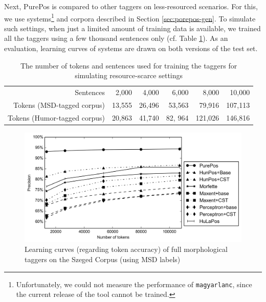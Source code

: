 Next, PurePos is compared to other taggers on less-resourced scenarios.
For this, we use systems\footnote{Unfortunately, we could not measure the performance of \texttt{magyarlanc}, since the current release of the tool cannot be trained.}  and corpora described in Section \ref{sec:porepos-gen}.
To simulate such settings, when just a limited amount of training data is available, we trained all the taggers using a few thousand sentences only (cf. Table \ref{tab:small-szeged}).
As an evaluation, learning curves of systems are drawn on both versions of the test set.

\begin{table}[H]
\centering
\caption{The number of tokens and sentences used for training the taggers for simulating resource-scarce settings}
\label{tab:small-szeged}
\begin{tabular}{ r | r r r r r}
Sentences & 2,000 & 4,000 & 6,000 & 8,000 & 10,000 \\
Tokens (MSD-tagged corpus) & 13,555 & 26,496 & 53,563 & 79,916 & 107,113 \\
Tokens (Humor-tagged corpus) & 20,863 & 41,740 & 82, 964 & 121,026 & 146,816 \\
\end{tabular}
\end{table}


\begin{figure}[H]
  \centering
  \includegraphics[width=1\textwidth]{MorphTagging/msd_token.png} 
  \caption{Learning curves (regarding token accuracy) of full morphological taggers on the Szeged Corpus (using MSD labels)}
  \label{fig:msd-token}
\end{figure}

